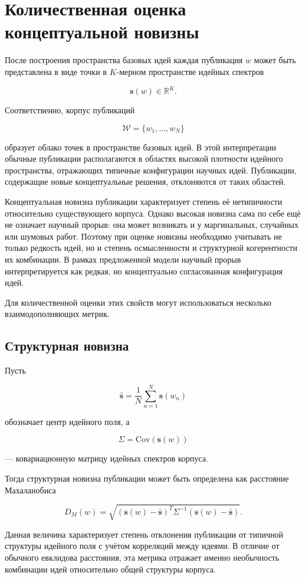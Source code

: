 \documentclass[review,3p,times]{elsarticle}
\begin{document}
\section{Количественная оценка концептуальной новизны}

После построения пространства базовых идей каждая публикация $w$ может быть представлена в виде точки в $K$-мерном пространстве идейных спектров

\[
\mathbf{s}(w)\in \mathbb{R}^K.
\]

Соответственно, корпус публикаций

\[
\mathcal{W}=\{w_1,\dots,w_N\}
\]

образует облако точек в пространстве базовых идей. В этой интерпретации обычные публикации располагаются в областях высокой плотности идейного пространства, отражающих типичные конфигурации научных идей. Публикации, содержащие новые концептуальные решения, отклоняются от таких областей.

Концептуальная новизна публикации характеризует степень её нетипичности относительно существующего корпуса. Однако высокая новизна сама по себе ещё не означает научный прорыв: она может возникать и у маргинальных, случайных или шумовых работ. Поэтому при оценке новизны необходимо учитывать не только редкость идей, но и степень осмысленности и структурной когерентности их комбинации. В рамках предложенной модели научный прорыв интерпретируется как редкая, но концептуально согласованная конфигурация идей.

Для количественной оценки этих свойств могут использоваться несколько взаимодополняющих метрик.

\subsection{Структурная новизна}

Пусть

\[
\bar{\mathbf{s}}=\frac{1}{N}\sum_{n=1}^{N}\mathbf{s}(w_n)
\]

обозначает центр идейного поля, а

\[
\Sigma=\mathrm{Cov}(\mathbf{s}(w))
\]

— ковариационную матрицу идейных спектров корпуса.

Тогда структурная новизна публикации может быть определена как расстояние Махаланобиса

\[
D_M(w)=
\sqrt{
(\mathbf{s}(w)-\bar{\mathbf{s}})^T
\Sigma^{-1}
(\mathbf{s}(w)-\bar{\mathbf{s}})
}.
\]

Данная величина характеризует степень отклонения публикации от типичной структуры идейного поля с учётом корреляций между идеями. В отличие от обычного евклидова расстояния, эта метрика отражает именно необычность комбинации идей относительно общей структуры корпуса.
\end{document}

